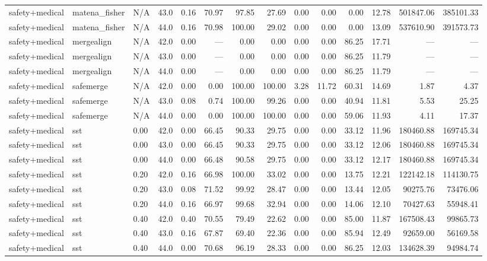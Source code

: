 \documentclass{article}
\begin{document}
\begin{table}[H]
{\begin{tabular}{llllrrrrrrrrrr}
safety+medical & matena\_fisher & N/A & 43.0 & 0.16 & 70.97 & 97.85 & 27.69 & 0.00 & 0.00 & 0.00 & 12.78 & 501847.06 & 385101.33 \\
safety+medical & matena\_fisher & N/A & 44.0 & 0.16 & 70.98 & 100.00 & 29.02 & 0.00 & 0.00 & 0.00 & 13.09 & 537610.90 & 391573.73 \\
safety+medical & mergealign & N/A & 42.0 & 0.00 & --- & 0.00 & 0.00 & 0.00 & 0.00 & 86.25 & 17.71 & --- & --- \\
safety+medical & mergealign & N/A & 43.0 & 0.00 & --- & 0.00 & 0.00 & 0.00 & 0.00 & 86.25 & 11.79 & --- & --- \\
safety+medical & mergealign & N/A & 44.0 & 0.00 & --- & 0.00 & 0.00 & 0.00 & 0.00 & 86.25 & 11.79 & --- & --- \\
safety+medical & safemerge & N/A & 42.0 & 0.00 & 0.00 & 100.00 & 100.00 & 3.28 & 11.72 & 60.31 & 14.69 & 1.87 & 4.37 \\
safety+medical & safemerge & N/A & 43.0 & 0.08 & 0.74 & 100.00 & 99.26 & 0.00 & 0.00 & 40.94 & 11.81 & 5.53 & 25.25 \\
safety+medical & safemerge & N/A & 44.0 & 0.00 & 0.00 & 100.00 & 100.00 & 0.00 & 0.00 & 59.06 & 11.93 & 4.11 & 17.37 \\
safety+medical & sst & 0.00 & 42.0 & 0.00 & 66.45 & 90.33 & 29.75 & 0.00 & 0.00 & 33.12 & 11.96 & 180460.88 & 169745.34 \\
safety+medical & sst & 0.00 & 43.0 & 0.00 & 66.45 & 90.33 & 29.75 & 0.00 & 0.00 & 33.12 & 12.06 & 180460.88 & 169745.34 \\
safety+medical & sst & 0.00 & 44.0 & 0.00 & 66.48 & 90.58 & 29.75 & 0.00 & 0.00 & 33.12 & 12.17 & 180460.88 & 169745.34 \\
safety+medical & sst & 0.20 & 42.0 & 0.16 & 66.98 & 100.00 & 33.02 & 0.00 & 0.00 & 13.75 & 12.21 & 122142.18 & 114130.75 \\
safety+medical & sst & 0.20 & 43.0 & 0.08 & 71.52 & 99.92 & 28.47 & 0.00 & 0.00 & 13.44 & 12.05 & 90275.76 & 73476.06 \\
safety+medical & sst & 0.20 & 44.0 & 0.16 & 66.97 & 99.68 & 32.94 & 0.00 & 0.00 & 14.06 & 12.10 & 70427.63 & 55948.41 \\
safety+medical & sst & 0.40 & 42.0 & 0.40 & 70.55 & 79.49 & 22.62 & 0.00 & 0.00 & 85.00 & 11.87 & 167508.43 & 99865.73 \\
safety+medical & sst & 0.40 & 43.0 & 0.16 & 67.87 & 69.40 & 22.36 & 0.00 & 0.00 & 85.94 & 12.49 & 92659.00 & 56169.58 \\
safety+medical & sst & 0.40 & 44.0 & 0.00 & 70.68 & 96.19 & 28.33 & 0.00 & 0.00 & 86.25 & 12.03 & 134628.39 & 94984.74 \\

\end{tabular}}
\end{table}
\end{document}
